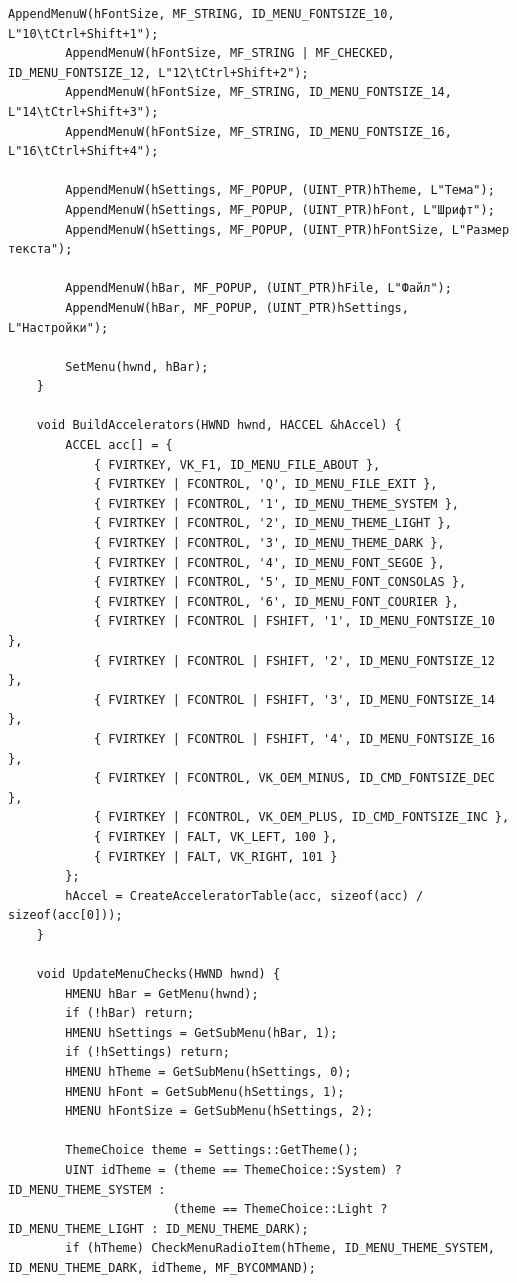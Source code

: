 \begin{lstlisting}[style=CodeListing]
        AppendMenuW(hFontSize, MF_STRING, ID_MENU_FONTSIZE_10, L"10\tCtrl+Shift+1");
        AppendMenuW(hFontSize, MF_STRING | MF_CHECKED, ID_MENU_FONTSIZE_12, L"12\tCtrl+Shift+2");
        AppendMenuW(hFontSize, MF_STRING, ID_MENU_FONTSIZE_14, L"14\tCtrl+Shift+3");
        AppendMenuW(hFontSize, MF_STRING, ID_MENU_FONTSIZE_16, L"16\tCtrl+Shift+4");
        
        AppendMenuW(hSettings, MF_POPUP, (UINT_PTR)hTheme, L"Тема");
        AppendMenuW(hSettings, MF_POPUP, (UINT_PTR)hFont, L"Шрифт");
        AppendMenuW(hSettings, MF_POPUP, (UINT_PTR)hFontSize, L"Размер текста");
        
        AppendMenuW(hBar, MF_POPUP, (UINT_PTR)hFile, L"Файл");
        AppendMenuW(hBar, MF_POPUP, (UINT_PTR)hSettings, L"Настройки");
        
        SetMenu(hwnd, hBar);
    }
    
    void BuildAccelerators(HWND hwnd, HACCEL &hAccel) {
        ACCEL acc[] = {
            { FVIRTKEY, VK_F1, ID_MENU_FILE_ABOUT },
            { FVIRTKEY | FCONTROL, 'Q', ID_MENU_FILE_EXIT },
            { FVIRTKEY | FCONTROL, '1', ID_MENU_THEME_SYSTEM },
            { FVIRTKEY | FCONTROL, '2', ID_MENU_THEME_LIGHT },
            { FVIRTKEY | FCONTROL, '3', ID_MENU_THEME_DARK },
            { FVIRTKEY | FCONTROL, '4', ID_MENU_FONT_SEGOE },
            { FVIRTKEY | FCONTROL, '5', ID_MENU_FONT_CONSOLAS },
            { FVIRTKEY | FCONTROL, '6', ID_MENU_FONT_COURIER },
            { FVIRTKEY | FCONTROL | FSHIFT, '1', ID_MENU_FONTSIZE_10 },
            { FVIRTKEY | FCONTROL | FSHIFT, '2', ID_MENU_FONTSIZE_12 },
            { FVIRTKEY | FCONTROL | FSHIFT, '3', ID_MENU_FONTSIZE_14 },
            { FVIRTKEY | FCONTROL | FSHIFT, '4', ID_MENU_FONTSIZE_16 },
            { FVIRTKEY | FCONTROL, VK_OEM_MINUS, ID_CMD_FONTSIZE_DEC },
            { FVIRTKEY | FCONTROL, VK_OEM_PLUS, ID_CMD_FONTSIZE_INC },
            { FVIRTKEY | FALT, VK_LEFT, 100 },
            { FVIRTKEY | FALT, VK_RIGHT, 101 }
        };
        hAccel = CreateAcceleratorTable(acc, sizeof(acc) / sizeof(acc[0]));
    }
    
    void UpdateMenuChecks(HWND hwnd) {
        HMENU hBar = GetMenu(hwnd);
        if (!hBar) return;
        HMENU hSettings = GetSubMenu(hBar, 1);
        if (!hSettings) return;
        HMENU hTheme = GetSubMenu(hSettings, 0);
        HMENU hFont = GetSubMenu(hSettings, 1);
        HMENU hFontSize = GetSubMenu(hSettings, 2);
        
        ThemeChoice theme = Settings::GetTheme();
        UINT idTheme = (theme == ThemeChoice::System) ? ID_MENU_THEME_SYSTEM : 
                       (theme == ThemeChoice::Light ? ID_MENU_THEME_LIGHT : ID_MENU_THEME_DARK);
        if (hTheme) CheckMenuRadioItem(hTheme, ID_MENU_THEME_SYSTEM, ID_MENU_THEME_DARK, idTheme, MF_BYCOMMAND);
        

\end{lstlisting}

